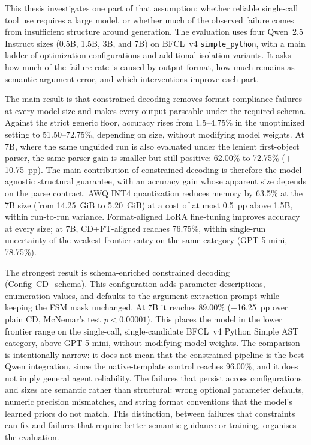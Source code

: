 This thesis investigates one part of that assumption: whether reliable
single-call tool use requires a large model, or whether much of the observed
failure comes from insufficient structure around generation. The evaluation uses
four Qwen~2.5 Instruct sizes (0.5B, 1.5B, 3B, and 7B) on BFCL~v4
\texttt{simple\_python}, with a main ladder of optimization configurations and
additional isolation variants. It asks how much of the failure rate is caused by
output format, how much remains as semantic argument error, and which
interventions improve each part.

The main result is that constrained decoding removes format-compliance failures
at every model size and makes every output parseable under the required schema.
Against the strict generic floor, accuracy rises from 1.5--4.75\% in the
unoptimized setting to 51.50--72.75\%, depending on size, without modifying
model weights. At 7B, where the same unguided run is also evaluated under the
lenient first-object parser, the same-parser gain is smaller but still positive:
62.00\% to 72.75\% ($+$10.75~pp). The main contribution of constrained
decoding is therefore the model-agnostic structural guarantee, with an accuracy
gain whose apparent size depends on the parse contract. AWQ INT4 quantization
reduces memory by 63.5\% at the 7B size (from 14.25~GiB to 5.20~GiB) at a cost
of at most 0.5~pp above 1.5B, within run-to-run variance. Format-aligned LoRA
fine-tuning improves accuracy at every size; at 7B, CD+FT-aligned reaches
76.75\%, within single-run uncertainty of the weakest frontier entry on the
same category (GPT-5-mini, 78.75\%).

The strongest result is schema-enriched constrained decoding
(Config~CD+schema). This configuration adds parameter descriptions, enumeration
values, and defaults to the argument extraction prompt while keeping the FSM
mask unchanged. At 7B it reaches 89.00\% ($+$16.25~pp over plain CD, McNemar's
test $p < 0.00001$). This places the model in the lower frontier range on the
single-call, single-candidate BFCL~v4 Python Simple AST category, above
GPT-5-mini, without modifying model weights. The comparison is intentionally
narrow: it does not mean that the constrained pipeline is the best Qwen
integration, since the native-template control reaches 96.00\%, and it does
not imply general agent reliability. The failures that persist across
configurations and sizes are semantic rather than structural: wrong optional
parameter defaults, numeric precision mismatches, and string format conventions
that the model's learned priors do not match. This distinction, between failures
that constraints can fix and failures that require better semantic guidance or
training, organises the evaluation.

